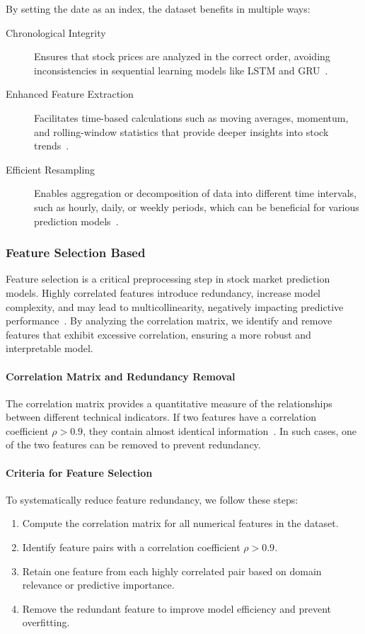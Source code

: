 By setting the date as an index, the dataset benefits in multiple ways:
\begin{description}
    \item[Chronological Integrity] Ensures that stock prices are analyzed in the correct order,
    avoiding inconsistencies in sequential learning models like LSTM and GRU~\parencite{guo2024LSTMStock}.
    \item[Enhanced Feature Extraction] Facilitates time-based calculations such as moving averages, 
    momentum, and rolling-window statistics that provide deeper insights into stock 
    trends~\parencite{shaban2024SMPDL}.
    \item[Efficient Resampling] Enables aggregation or decomposition of data into different time 
    intervals, such as hourly, daily, or weekly periods, which can be beneficial for various prediction 
    models~\parencite{agrawal2022StockPrediction}.
\end{description} 

\subsubsection{Feature Selection Based}

Feature selection is a critical preprocessing step in stock market prediction models. Highly 
correlated features introduce redundancy, increase model complexity, and may lead to 
multicollinearity, negatively impacting predictive 
performance~\parencite{balasubramanian2023SystematicSurvey, guo2024LSTMStock}. By analyzing the
correlation matrix, we identify and remove features that exhibit excessive 
correlation, ensuring a more robust and interpretable model.

\paragraph{Correlation Matrix and Redundancy Removal}
The correlation matrix provides a quantitative measure of the relationships between different
technical indicators. If two features have a correlation coefficient \(\rho > 0.9\), they
contain almost identical information~\parencite{nabipour2020DeepLearning}. In such cases, one of
the two features can be removed to prevent redundancy.

\paragraph{Criteria for Feature Selection}
To systematically reduce feature redundancy, we follow these steps:
\begin{enumerate}
    \item Compute the correlation matrix for all numerical features in the dataset.
    \item Identify feature pairs with a correlation coefficient \(\rho > 0.9\).
    \item Retain one feature from each highly correlated pair based on domain relevance or predictive importance.
    \item Remove the redundant feature to improve model efficiency and prevent overfitting.
\end{enumerate}

